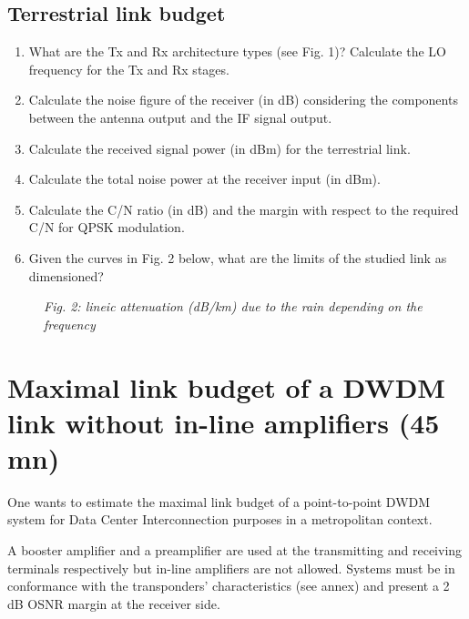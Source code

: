 \documentclass[a4paper,11pt]{article}
\begin{document}
\subsection{Terrestrial link budget}

\begin{enumerate}[label=\alph*., start=8]
    \item What are the Tx and Rx architecture types (see Fig. 1)? Calculate the LO frequency for the Tx and Rx stages.
    
    \item Calculate the noise figure of the receiver (in dB) considering the components between the antenna output and the IF signal output.
    
    \item Calculate the received signal power (in dBm) for the terrestrial link.
    
    \item Calculate the total noise power at the receiver input (in dBm).
    
    \item Calculate the C/N ratio (in dB) and the margin with respect to the required C/N for QPSK modulation.
    
    \item Given the curves in Fig. 2 below, what are the limits of the studied link as dimensioned?
\end{enumerate}

\begin{figure}[h]
    \centering
    \textit{Fig. 2: lineic attenuation (dB/km) due to the rain depending on the frequency}
\end{figure}

\newpage

\section{Maximal link budget of a DWDM link without in-line amplifiers (45 mn)}

One wants to estimate the maximal link budget of a point-to-point DWDM system for Data Center Interconnection purposes in a metropolitan context.

A booster amplifier and a preamplifier are used at the transmitting and receiving terminals respectively but in-line amplifiers are not allowed. Systems must be in conformance with the transponders' characteristics (see annex) and present a 2 dB OSNR margin at the receiver side.
\end{document}
